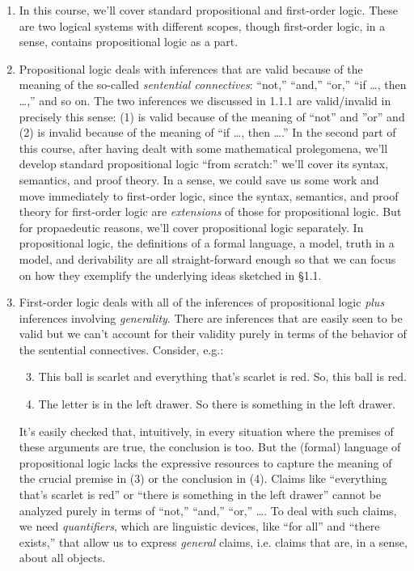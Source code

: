 \begin{enumerate}[\thesection.1]

	\item In this course, we'll cover standard propositional and first-order logic. These are two logical systems with different scopes, though first-order logic, in a sense, contains propositional logic as a part.
	
	\item Propositional logic deals with inferences that are valid because of the meaning of the so-called \emph{sentential connectives}: ``not,'' ``and,'' ``or,'' ``if \dots, then \dots,'' and so on. The two inferences we discussed in 1.1.1 are valid/invalid  in  precisely this sense: (1) is valid because of the meaning of ``not'' and ''or'' and (2) is invalid because of the meaning of ``if \dots, then \dots.'' In the second part of this course, after having dealt with some mathematical prolegomena, we'll develop standard propositional logic ``from scratch:'' we'll cover its syntax, semantics, and proof theory. In a sense, we could save us some work and move immediately to first-order logic, since the syntax, semantics, and proof theory for first-order logic are \emph{extensions} of those for propositional logic. But for propaedeutic reasons, we'll cover propositional logic separately. In propositional logic, the definitions of a formal language, a model, truth in a model, and derivability are all straight-forward enough so that we can focus on how they exemplify the underlying ideas sketched in \S1.1.
	
	\item First-order logic deals with all of the inferences of propositional logic \emph{plus} inferences involving \emph{generality}. There are inferences that are easily seen to be valid but we can't account for their validity purely in terms of the behavior of the sentential connectives. Consider, e.g.:
	
	\begin{enumerate}[(1)]
		\setcounter{enumii}{2}
	
		\item This ball is scarlet and everything that's scarlet is red. So, this ball is red.
		
		\item The letter is in the left drawer. So there is something in the left drawer.
	
	\end{enumerate}
	
	It's easily checked that, intuitively, in every situation where the premises of these arguments are true, the conclusion is too. But the (formal) language of propositional logic lacks the expressive resources to capture the meaning of the crucial premise in (3) or the conclusion in (4). Claims like ``everything that's scarlet is red'' or ``there is something in the left drawer'' cannot be analyzed purely in terms of ``not,'' ``and,'' ``or,'' \dots. To deal with such claims, we need \emph{quantifiers}, which are linguistic devices, like ``for all'' and ``there exists,'' that allow us to express \emph{general} claims, i.e. claims that are, in a sense, about all objects.
	

\end{enumerate}
